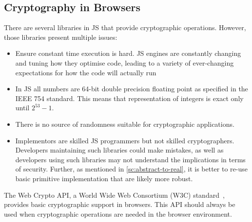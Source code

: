 \subsection{Cryptography in Browsers}\label{sc:webcrypto-api}

There are several libraries in JS that provide cryptographic
operations.
However, those libraries present multiple issues:
\begin{itemize}
    \item Ensure constant time execution is hard. JS engines are constantly changing and tuning how they optimise code, leading to a variety of ever-changing expectations for how the code will actually run
    \item In JS all numbers are 64-bit double precision floating point as specified in the IEEE 754 standard. This means that representation of integers is exact only until $2^{53} - 1$.
    \item There is no source of randomness suitable for cryptographic applications.
    \item Implementors are skilled JS programmers but not skilled cryptographers. Developers maintaining such libraries could make mistakes, as well as developers using such libraries may not understand the implications in terms of security. Further, as mentioned in \cref{sc:abstract-to-real}, it is better to re-use basic primitive implementation that are likely more robust. 
\end{itemize}

The Web Crypto API, a World Wide Web Consortium (W3C) standard~\cite{WebCryptoAPISpecification}, 
provides basic cryptographic support in browsers. This API should
always be used when cryptographic operations are needed in the browser
environment.

